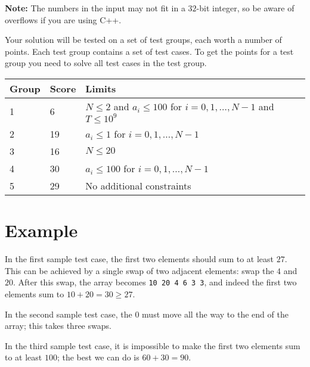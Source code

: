 \textbf{Note:} The numbers in the input may not fit in a $32$-bit integer, so be aware of overflows if you are using C++.


Your solution will be tested on a set of test groups, each worth a number of points. 
Each test group contains a set of test cases. To get the points for a test group you need to 
solve all test cases in the test group.

\noindent
\begin{tabular}{| l | l | l |}
\hline
Group & Score & Limits \\ \hline
1 & 6 & $N \le 2$ and $a_i \le 100$ for $i = 0, 1, \ldots, N-1$ and $T \le 10^9$ \\ \hline
2 & 19 & $a_i \le 1$ for $i = 0, 1, \ldots, N-1$ \\ \hline
3 & 16 & $N \le 20$ \\ \hline
4 & 30 & $a_i \le 100$ for $i = 0, 1, \ldots, N-1$ \\ \hline
5 & 29 & No additional constraints \\ \hline
\end{tabular}

\section*{Example}

In the first sample test case, the first two elements should sum to at least $27$. 
This can be achieved by a single swap of two adjacent elements: swap the $4$ and $20$. 
After this swap, the array becomes \verb|10 20 4 6 3 3|, and indeed the first two elements sum to $10+20 = 30\ge 27$.

In the second sample test case, the $0$ must move all the way to the end of the array; this takes three swaps.

In the third sample test case, it is impossible to make the first two elements sum to at least $100$; 
the best we can do is $60+30=90$.
